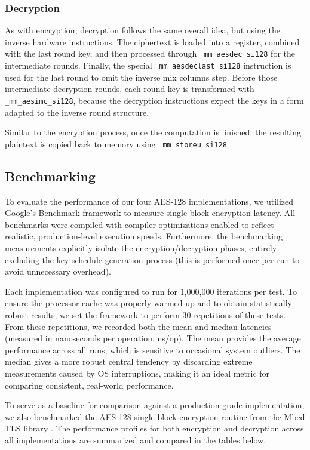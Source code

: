 \subsubsection{Decryption}

As with encryption, decryption follows the same overall idea, but using the inverse hardware instructions. The ciphertext is loaded into a register, combined with the last round key, and then processed through \texttt{\_mm\_aesdec\_si128} for the intermediate rounds. Finally, the special \texttt{\_mm\_aesdeclast\_si128} instruction is used for the last round to omit the inverse mix columns step. Before those intermediate decryption rounds, each round key is transformed with \texttt{\_mm\_aesimc\_si128}, because the decryption instructions expect the keys in a form adapted to the inverse round structure.

Similar to the encryption process, once the computation is finished, the resulting plaintext is copied back to memory using \texttt{\_mm\_storeu\_si128}.


\subsection{Benchmarking}

To evaluate the performance of our four AES-128 implementations, we utilized Google's Benchmark framework \cite{google_benchmark} to measure single-block encryption latency. All benchmarks were compiled with compiler optimizations enabled to reflect realistic, production-level execution speeds. Furthermore, the benchmarking measurements explicitly isolate the encryption/decryption phases, entirely excluding the key-schedule generation process (this is performed once per run to avoid unnecessary overhead).

Each implementation was configured to run for 1,000,000 iterations per test. To ensure the processor cache was properly warmed up and to obtain statistically robust results, we set the framework to perform 30 repetitions of these tests. From these repetitions, we recorded both the mean and median latencies (measured in nanoseconds per operation, ns/op). The mean provides the average performance across all runs, which is sensitive to occasional system outliers. The median gives a more robust central tendency by discarding extreme measurements caused by OS interruptions, making it an ideal metric for comparing consistent, real-world performance.

To serve as a baseline for comparison against a production-grade implementation, we also benchmarked the AES-128 single-block encryption routine from the Mbed TLS library \cite{mbedtls_library}. The performance profiles for both encryption and decryption across all implementations are summarized and compared in the tables below.

